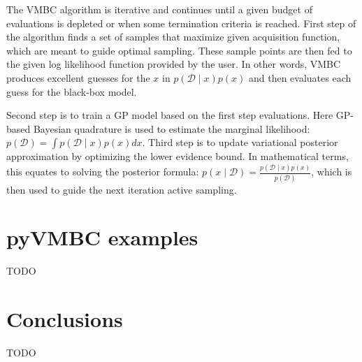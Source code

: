 \documentclass[english,oneside,openany]{UH_DS_report}
\begin{document}
The VMBC algorithm is iterative and continues until a given budget of evaluations is depleted or when 
some termination criteria is reached. First step of the algorithm finds a set of samples that maximize given 
acquisition function, which are meant to guide optimal sampling. These sample points are then fed to the
given log likelihood function provided by the user\cite{acerbi2018}. In other words, VMBC produces excellent guesses for the $x$ in 
$p(\mathcal{D} \mid x)p(x)$ and then evaluates each guess for the black-box model.

Second step is to train a GP model based on the first step evaluations\cite{acerbi2018}. Here GP-based Bayesian quadrature 
is used to estimate the marginal likelihood: $p(\mathcal{D})=\int p(\mathcal{D}\mid x)p(x)dx$.
Third step is to update variational posterior approximation by optimizing the 
lower evidence bound\cite{acerbi2018}. In mathematical terms, this equates to solving the posterior
formula: $p(x\mid\mathcal{D}) = \frac{p(\mathcal{D}\mid x)p(x)}{p(\mathcal{D})}$, which is then used to guide 
the next iteration active sampling.

\chapter{pyVMBC examples}
\label{chapter:layout}

TODO

\chapter{Conclusions}
\label{chapter:conclusions}

TODO

% 
\cleardoublepage %

\renewcommand\bibname{References}
\addcontentsline{toc}{chapter}{\bibname} %

\end{document}

